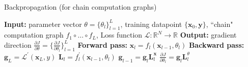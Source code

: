 

\newcommand{\xin}{\mathbf{x}_{\texttt{in}}}
\newcommand{\xout}{\mathbf{x}_{\texttt{out}}}
\newcommand{\xint}{\mathbf{x}_{\texttt{in}_t}}
\newcommand{\xoutt}{\mathbf{x}_{\texttt{out}_t}}
\newcommand{\localgrad}{\mathbf{L}}
\newcommand{\localgradx}{\mathbf{L}^{\mathbf{x}}}
\newcommand{\localgradtheta}{\mathbf{L}^{\theta}}
\newcommand{\costgrad}{\mathbf{g}}
\newcommand{\costgradxin}{\mathbf{g}^{\xin}}
\newcommand{\costgradxout}{\mathbf{g}^{\xout}}
\newcommand{\costgradin}{\mathbf{g}_{\texttt{in}}}
\newcommand{\costgradout}{\mathbf{g}_{\texttt{out}}}
\newcommand{\costgradtheta}{\mathbf{g}^{\theta}}
\newcommand{\costgradl}{\mathbf{g}_l}


\begin{algorithm}[h]
    \label{gradient_descent}
    \SetAlgoVlined
    \DontPrintSemicolon
    \caption{Backpropagation (for chain computation graphs)}
    {\bf Input:} parameter vector $\theta = \{\theta_l\}_{l=1}^L$, training datapoint $\{\mathbf{x}_0,\mathbf{y}\}$, ``chain" computation graph $f_1 \circ \ldots \circ f_L$, Loss function $\mathcal{L}: \mathbb{R}^N \rightarrow \mathbb{R}$\;
    {\bf Output:} gradient direction $\frac{\partial J}{\partial \theta} = \{\frac{\partial J}{\partial \theta_l}\}_{l=1}^L$ \;
    \;
    \textbf{Forward pass:}\;
     {
        $\mathbf{x}_l = f_l(\mathbf{x}_{l-1}, \theta_l)$\;
    }
    \;
    \textbf{Backward pass:}\;
    $\costgrad_L = \mathcal{L}^{\prime}(\mathbf{x}_L,y)$\;
     {
    $\localgrad_{l} = f_l^{\prime}(\mathbf{x}_{l-1},\theta_l)$\;
    $\costgrad_{l-1} = \costgrad_{l}\localgrad^{\mathbf{x}}_{l}$\;
    $\frac{\partial J}{\partial \theta_l} = \costgrad_{l}\localgrad^{\theta}_{l}$\;
    }
    \label{alg:backpropagation:backprop_for_chains}
\end{algorithm}
